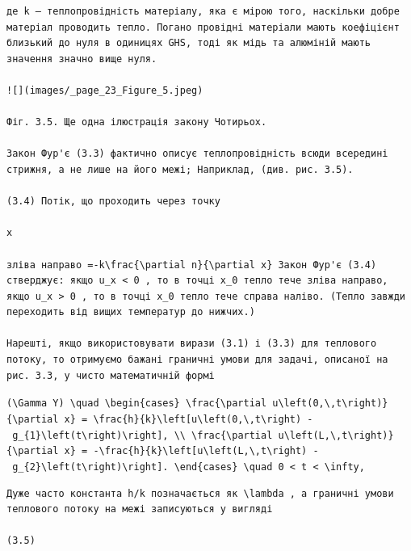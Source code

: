 \documentclass[
  ukrainian,
]{article}
\begin{document}
\begin{verbatim}
де k — теплопровідність матеріалу, яка є мірою того, наскільки добре матеріал проводить тепло. Погано провідні матеріали мають коефіцієнт близький до нуля в одиницях GHS, тоді як мідь та алюміній мають значення значно вище нуля.

![](images/_page_23_Figure_5.jpeg)

Фіг. 3.5. Ще одна ілюстрація закону Чотирьох.

Закон Фур'є (3.3) фактично описує теплопровідність всюди всередині стрижня, а не лише на його межі; Наприклад, (див. рис. 3.5).

(3.4) Потік, що проходить через точку

x

зліва направо =-k\frac{\partial n}{\partial x} Закон Фур'є (3.4) стверджує: якщо u_x < 0 , то в точці x_0 тепло тече зліва направо, якщо u_x > 0 , то в точці x_0 тепло тече справа наліво. (Тепло завжди переходить від вищих температур до нижчих.)

Нарешті, якщо використовувати вирази (3.1) і (3.3) для теплового потоку, то отримуємо бажані граничні умови для задачі, описаної на рис. 3.3, у чисто математичній формі
\end{verbatim}

\texttt{(\textbackslash{}Gamma\ Y)\ \textbackslash{}quad\ \textbackslash{}begin\{cases\}\ \textbackslash{}frac\{\textbackslash{}partial\ u\textbackslash{}left(0,\textbackslash{},t\textbackslash{}right)\}\{\textbackslash{}partial\ x\}\ =\ \textbackslash{}frac\{h\}\{k\}\textbackslash{}left{[}u\textbackslash{}left(0,\textbackslash{},t\textbackslash{}right)\ -\ g\_\{1\}\textbackslash{}left(t\textbackslash{}right)\textbackslash{}right{]},\ \textbackslash{}\textbackslash{}\ \textbackslash{}frac\{\textbackslash{}partial\ u\textbackslash{}left(L,\textbackslash{},t\textbackslash{}right)\}\{\textbackslash{}partial\ x\}\ =\ -\textbackslash{}frac\{h\}\{k\}\textbackslash{}left{[}u\textbackslash{}left(L,\textbackslash{},t\textbackslash{}right)\ -\ g\_\{2\}\textbackslash{}left(t\textbackslash{}right)\textbackslash{}right{]}.\ \textbackslash{}end\{cases\}\ \textbackslash{}quad\ 0\ \textless{}\ t\ \textless{}\ \textbackslash{}infty,}

\begin{verbatim}
Дуже часто константа h/k позначається як \lambda , а граничні умови теплового потоку на межі записуються у вигляді

(3.5)
\end{verbatim}
\end{document}
